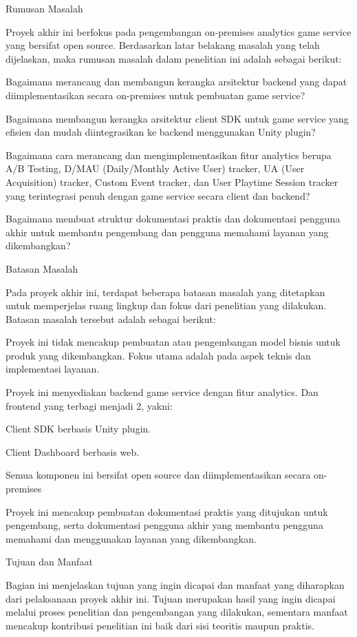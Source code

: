Rumusan Masalah

Proyek akhir ini berfokus pada pengembangan on-premises analytics game service yang bersifat open source. Berdasarkan latar belakang masalah yang telah dijelaskan, maka rumusan masalah dalam penelitian ini adalah sebagai berikut:

Bagaimana merancang dan membangun kerangka arsitektur backend yang dapat diimplementasikan secara on-premises untuk pembuatan game service?

Bagaimana membangun kerangka arsitektur client SDK untuk game service yang efisien dan mudah diintegrasikan ke backend menggunakan Unity plugin?

Bagaimana cara merancang dan mengimplementasikan fitur analytics berupa A/B Testing, D/MAU (Daily/Monthly Active User) tracker, UA (User Acquisition) tracker, Custom Event tracker, dan User Playtime Session tracker yang terintegrasi penuh dengan game service secara client dan backend?

Bagaimana membuat struktur dokumentasi praktis dan dokumentasi pengguna akhir untuk membantu pengembang dan pengguna memahami layanan yang dikembangkan?

Batasan Masalah

Pada proyek akhir ini, terdapat beberapa batasan masalah yang ditetapkan untuk memperjelas ruang lingkup dan fokus dari penelitian yang dilakukan. Batasan masalah tersebut adalah sebagai berikut:

Proyek ini tidak mencakup pembuatan atau pengembangan model bisnis untuk produk yang dikembangkan. Fokus utama adalah pada aspek teknis dan implementasi layanan.

Proyek ini menyediakan backend game service dengan fitur analytics. Dan frontend yang terbagi menjadi 2, yakni:

Client SDK berbasis Unity plugin.

Client Dashboard berbasis web.

Semua komponen ini bersifat open source dan diimplementasikan secara on-premises

Proyek ini mencakup pembuatan dokumentasi praktis yang ditujukan untuk pengembang, serta dokumentasi pengguna akhir yang membantu pengguna memahami dan menggunakan layanan yang dikembangkan.

Tujuan dan Manfaat

Bagian ini menjelaskan tujuan yang ingin dicapai dan manfaat yang diharapkan dari pelaksanaan proyek akhir ini. Tujuan merupakan hasil yang ingin dicapai melalui proses penelitian dan pengembangan yang dilakukan, sementara manfaat mencakup kontribusi penelitian ini baik dari sisi teoritis maupun praktis.


